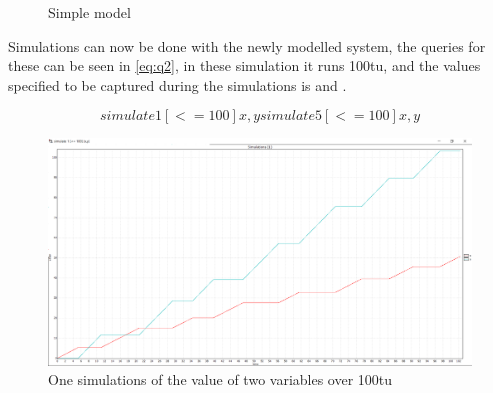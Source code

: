 \begin{figure}
	\centering
	\caption{Simple model}
	\label{fig:showcase01}
\end{figure}

Simulations can now be done with the newly modelled system, the queries for these can be seen in \cref{eq:q2}, in these simulation it runs 100\gls{tu}, and the values specified to be captured during the simulations is  and .

\begin{equation}\label{eq:q2}
simulate 1 [<= 100] {x,y}
simulate 5 [<= 100] {x,y}
\end{equation}

\begin{figure}[!h]
	\includegraphics[width=\textwidth]{graphics/showcase01.png}
	\caption{One simulations of the value of two variables  over 100\gls{tu}}
	\label{fig:sim01}
\end{figure}

